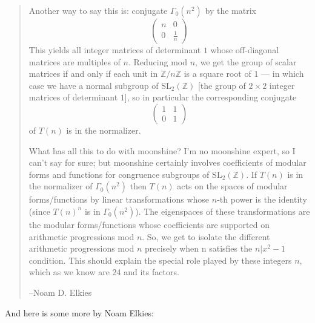 \documentclass{article}
\begin{document}
\begin{quote}
Another way to say this is: conjugate \(\Gamma_0(n^2)\) by the matrix
\[\left(\begin{array}{cc}n&0\\0&\frac1n\end{array}\right)\] This yields
all integer matrices of determinant \(1\) whose off-diagonal matrices
are multiples of \(n\). Reducing mod \(n\), we get the group of scalar
matrices if and only if each unit in \(\mathbb{Z}/n\mathbb{Z}\) is a
square root of \(1\) --- in which case we have a normal subgroup of
\(\mathrm{SL}_2(\mathbb{Z})\) {[}the group of \(2\times2\) integer
matrices of determinant \(1\){]}, so in particular the corresponding
conjugate \[\left(\begin{array}{cc}1&1\\0&1\end{array}\right)\] of
\(T(n)\) is in the normalizer.

What has all this to do with moonshine? I'm no moonshine expert, so I
can't say for sure; but moonshine certainly involves coefficients of
modular forms and functions for congruence subgroups of
\(\mathrm{SL}_2(\mathbb{Z})\). If \(T(n)\) is in the normalizer of
\(\Gamma_0(n^2)\) then \(T(n)\) acts on the spaces of modular
forms/functions by linear transformations whose \(n\)-th power is the
identity (since \(T(n)^n\) is in \(\Gamma_0(n^2)\)). The eigenspaces of
these transformations are the modular forms/functions whose coefficients
are supported on arithmetic progressions mod \(n\). So, we get to
isolate the different arithmetic progressions mod \(n\) precisely when n
satisfies the \(n|x^2-1\) condition. This should explain the special
role played by these integers \(n\), which as we know are 24 and its
factors.

--Noam D. Elkies
\end{quote}

And here is some more by Noam Elkies:
\end{document}
